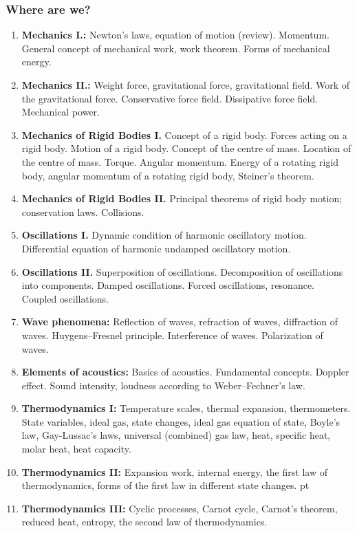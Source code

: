 \documentclass[t,aspectratio=169]{beamer}
\begin{document}
\begin{frame}
\frametitle{Where are we?}
\begin{enumerate}
\setlength{\parskip}{0pt}
\setlength{\itemsep}{0pt}
\item \textbf{Mechanics I.:} Newton’s laws, equation of motion (review). Momentum. General concept of mechanical work, work theorem. Forms of mechanical energy.
\item \textbf{Mechanics II.:} Weight force, gravitational force, gravitational field. Work of the gravitational force. Conservative force field. Dissipative force field. Mechanical power.
\item \textbf{Mechanics of Rigid Bodies I.} Concept of a rigid body. Forces acting on a rigid body. Motion of a rigid body. Concept of the centre of mass. Location of the centre of mass. Torque. Angular momentum. Energy of a rotating rigid body, angular momentum of a rotating rigid body, Steiner’s theorem.
\item \textbf{Mechanics of Rigid Bodies II.} Principal theorems of rigid body motion; conservation laws. Collisions.
\item \textbf{Oscillations I.} Dynamic condition of harmonic oscillatory motion. Differential equation of harmonic undamped oscillatory motion.
\pagebreak
\item \textbf{Oscillations II.} Superposition of oscillations. Decomposition of oscillations into components. Damped oscillations. Forced oscillations, resonance. Coupled oscillations.
\item \textbf{Wave phenomena:} Reflection of waves, refraction of waves, diffraction of waves. Huygens–Fresnel principle. Interference of waves. Polarization of waves.
\item \textbf{Elements of acoustics:} Basics of acoustics. Fundamental concepts. Doppler effect. Sound intensity, loudness according to Weber–Fechner’s law.
\item \textbf{Thermodynamics I:} Temperature scales, thermal expansion, thermometers. State variables, ideal gas, state changes, ideal gas equation of state, Boyle’s law, Gay-Lussac’s laws, universal (combined) gas law, heat, specific heat, molar heat, heat capacity.
\item \textbf{Thermodynamics II:} Expansion work, internal energy, the first law of thermodynamics, forms of the first law in different state changes.
\pagebreak
{} pt
\item \textbf{Thermodynamics III:} Cyclic processes, Carnot cycle, Carnot’s theorem, reduced heat, entropy, the second law of thermodynamics.

\end{enumerate}
\end{frame}
\end{document}
